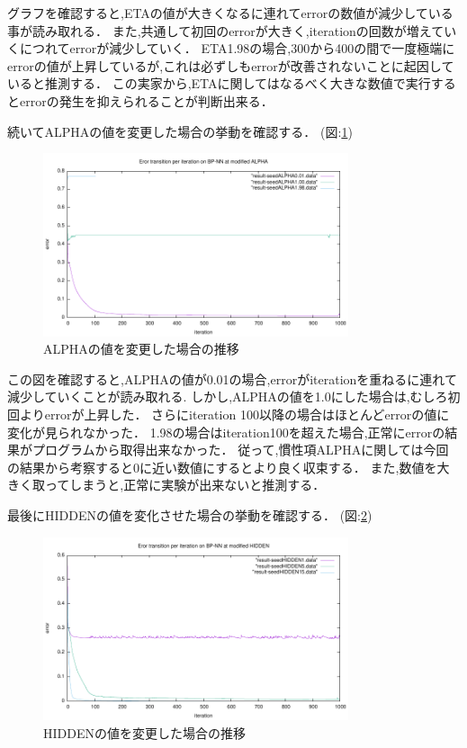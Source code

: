 グラフを確認すると,ETAの値が大きくなるに連れてerrorの数値が減少している事が読み取れる．
また,共通して初回のerrorが大きく,iterationの回数が増えていくにつれてerrorが減少していく．
ETA1.98の場合,300から400の間で一度極端にerrorの値が上昇しているが,これは必ずしもerrorが改善されないことに起因していると推測する．
この実家から,ETAに関してはなるべく大きな数値で実行するとerrorの発生を抑えられることが判断出来る．

続いてALPHAの値を変更した場合の挙動を確認する． (図:\ref{fig:ALPHAresult})

\begin{figure}[H]
    \centering
    \includegraphics[width=0.8\textwidth]{figs/Level3.2/ALPHA.pdf}
    \caption{ALPHAの値を変更した場合の推移}
\label{fig:ALPHAresult}
\end{figure}

この図を確認すると,ALPHAの値が0.01の場合,errorがiterationを重ねるに連れて減少していくことが読み取れる.
しかし,ALPHAの値を1.0にした場合は,むしろ初回よりerrorが上昇した．
さらにiteration 100以降の場合はほとんどerrorの値に変化が見られなかった．
1.98の場合はiteration100を超えた場合,正常にerrorの結果がプログラムから取得出来なかった．
従って,慣性項ALPHAに関しては今回の結果から考察すると0に近い数値にするとより良く収束する．
また,数値を大きく取ってしまうと,正常に実験が出来ないと推測する．

最後にHIDDENの値を変化させた場合の挙動を確認する． (図:\ref{fig:HIDDENresult})

\begin{figure}[H]
    \centering
    \includegraphics[width=0.8\textwidth]{figs/Level3.2/HIDDEN.pdf}
    \caption{HIDDENの値を変更した場合の推移}
\label{fig:HIDDENresult}
\end{figure}

